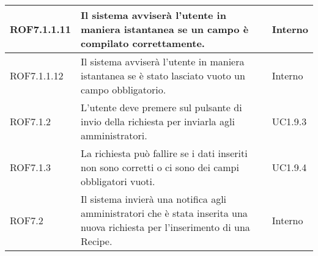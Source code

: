 \begin{center}
\begin{longtable}{| p{2.5cm} | p{8cm} | p{2cm} |}
		\hline
		ROF7.1.1.11 & Il sistema avviserà l'utente in maniera istantanea se un campo è compilato correttamente. & Interno \\
		\hline
		ROF7.1.1.12 & Il sistema avviserà l'utente in maniera istantanea se è stato lasciato vuoto un campo obbligatorio. & Interno \\
		\hline
		ROF7.1.2 & L'utente deve premere sul pulsante di invio della richiesta per inviarla agli amministratori. & UC1.9.3  \\
		\hline
		ROF7.1.3 & La richiesta può fallire se i dati inseriti non sono corretti o ci sono dei campi obbligatori vuoti. & UC1.9.4  \\
		\hline
		ROF7.2  & Il sistema invierà una notifica agli amministratori che è stata inserita una nuova richiesta per l'inserimento di una Recipe. & Interno \\
		\hline



\end{longtable}
\end{center}
